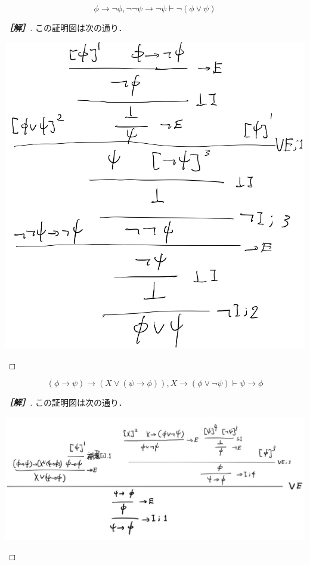 \documentclass[uplatex,dvipdfmx]{jsarticle}
\begin{document}
\begin{problem}[2007年度版(1)]
    \[\phi\to\lnot\phi,\lnot\lnot\psi\to\lnot\psi\vdash\lnot(\phi\lor\psi)\]
\end{problem}
\begin{proof}[\bf{［解］}]この証明図は次の通り．
    \begin{center}
        \includegraphics[width=15cm]{figure2.jpg}
    \end{center}
\end{proof}

\begin{problem}[2007年度版(2)]
    \[(\phi\to\psi)\to(X\lor(\psi\to\phi)),X\to(\phi\lor\lnot\psi)\vdash\psi\to\phi\]
\end{problem}
\begin{proof}[\bf{［解］}]この証明図は次の通り．
    \begin{center}
        \includegraphics[width=15cm]{figure3.jpg}
    \end{center}
\end{proof}
\end{document}
